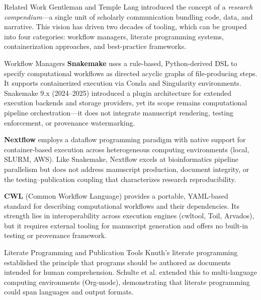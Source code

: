 \documentclass[
  ignorenonframetext,
]{beamer}
\begin{document}
\begin{frame}{Related Work}
\protect{}\label{related-work}
Gentleman and Temple Lang  introduced the
concept of a \emph{research compendium}---a single unit of scholarly
communication bundling code, data, and narrative. This vision has driven
two decades of tooling, which can be grouped into four categories:
workflow managers, literate programming systems, containerization
approaches, and best-practice frameworks.

\begin{block}{Workflow Managers}
\protect{}\label{workflow-managers}
\textbf{Snakemake}  uses a rule-based,
Python-derived DSL to specify computational workflows as directed
acyclic graphs of file-producing steps. It supports containerized
execution via Conda and Singularity environments. Snakemake 9.x
(2024--2025) introduced a plugin architecture for extended execution
backends and storage providers, yet its scope remains computational
pipeline orchestration---it does not integrate manuscript rendering,
testing enforcement, or provenance watermarking.

\textbf{Nextflow}  employs a dataflow
programming paradigm with native support for container-based execution
across heterogeneous computing environments (local, SLURM, AWS). Like
Snakemake, Nextflow excels at bioinformatics pipeline parallelism but
does not address manuscript production, document integrity, or the
testing--publication coupling that characterizes research
reproducibility.

\textbf{CWL} (Common Workflow Language)  provides a
portable, YAML-based standard for describing computational workflows and
their dependencies. Its strength lies in interoperability across
execution engines (cwltool, Toil, Arvados), but it requires external
tooling for manuscript generation and offers no built-in testing or
provenance framework.
\end{block}

\begin{block}{Literate Programming and Publication Tools}
\protect{}\label{literate-programming-and-publication-tools}
Knuth's literate programming  established the
principle that programs should be authored as documents intended for
human comprehension. Schulte et al. 
extended this to multi-language computing environments (Org-mode),
demonstrating that literate programming could span languages and output
formats.


\end{block}
\end{frame}
\end{document}
